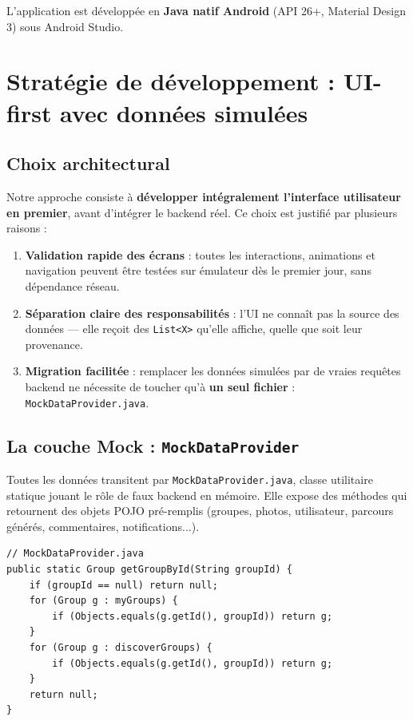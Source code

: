 \documentclass[a4paper,11pt]{article}
\newenvironment{codeblock}{
    \par\noindent\minipage{\linewidth}\vspace{4pt}
}{
    \vspace{4pt}\endminipage\par
}
\begin{document}
\noindent L'application est développée en \textbf{Java natif Android} (API 26+, Material Design 3) sous Android Studio.

\section{Stratégie de développement : UI-first avec données simulées}

\subsection{Choix architectural}

Notre approche consiste à \textbf{développer intégralement l'interface utilisateur en premier}, avant d'intégrer le backend réel. Ce choix est justifié par plusieurs raisons :

\begin{enumerate}[leftmargin=1.5em, itemsep=3pt]
    \item \textbf{Validation rapide des écrans} : toutes les interactions, animations et navigation peuvent être testées sur émulateur dès le premier jour, sans dépendance réseau.
    \item \textbf{Séparation claire des responsabilités} : l'UI ne connaît pas la source des données — elle reçoit des \texttt{List<X>} qu'elle affiche, quelle que soit leur provenance.
    \item \textbf{Migration facilitée} : remplacer les données simulées par de vraies requêtes backend ne nécessite de toucher qu'à \textbf{un seul fichier} : \texttt{MockDataProvider.java}.
\end{enumerate}

\subsection{La couche Mock : \texttt{MockDataProvider}}

Toutes les données transitent par \texttt{MockDataProvider.java}, classe utilitaire statique jouant le rôle de faux backend en mémoire. Elle expose des méthodes qui retournent des objets POJO pré-remplis (groupes, photos, utilisateur, parcours générés, commentaires, notifications...).

\begin{codeblock}
\begin{lstlisting}[caption={Exemple : recherche d'un groupe par ID (pattern centralisé)}]
// MockDataProvider.java
public static Group getGroupById(String groupId) {
    if (groupId == null) return null;
    for (Group g : myGroups) {
        if (Objects.equals(g.getId(), groupId)) return g;
    }
    for (Group g : discoverGroups) {
        if (Objects.equals(g.getId(), groupId)) return g;
    }
    return null;
}
\end{lstlisting}
\end{codeblock}
\end{document}
